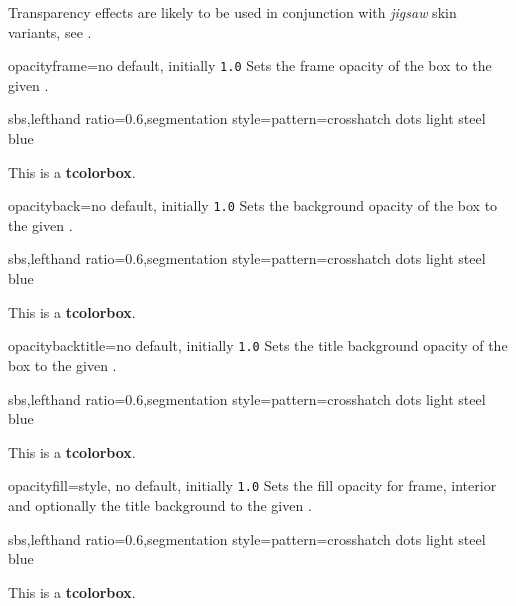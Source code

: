 \begin{marker}
Transparency effects are likely to be used in conjunction with \emph{jigsaw}
skin variants, see .
\end{marker}

\begin{docTcbKey}{opacityframe}{=}{no default, initially \texttt{1.0}}
  Sets the frame opacity of the box to the given .
\begin{dispExample*}{sbs,lefthand ratio=0.6,segmentation style={pattern=crosshatch dots light steel blue}}
\begin{tcolorbox}[opacityframe=0.25]
This is a \textbf{tcolorbox}.
\end{tcolorbox}
\end{dispExample*}
\end{docTcbKey}

\begin{docTcbKey}{opacityback}{=}{no default, initially \texttt{1.0}}
  Sets the background opacity of the box to the given .
\begin{dispExample*}{sbs,lefthand ratio=0.6,segmentation style={pattern=crosshatch dots light steel blue}}
\begin{tcolorbox}[standard jigsaw,
  opacityframe=0.5, opacityback=0.5]
This is a \textbf{tcolorbox}.
\end{tcolorbox}
\end{dispExample*}
\end{docTcbKey}


\begin{docTcbKey}{opacitybacktitle}{=}{no default, initially \texttt{1.0}}
  Sets the title background opacity of the box to the given .
\begin{dispExample*}{sbs,lefthand ratio=0.6,segmentation style={pattern=crosshatch dots light steel blue}}
\begin{tcolorbox}[standard jigsaw,
  opacityframe=0.5, opacitybacktitle=0.5,
  title filled, title=This is a title]
This is a \textbf{tcolorbox}.
\end{tcolorbox}
\end{dispExample*}
\end{docTcbKey}


\begin{docTcbKey}{opacityfill}{=}{style, no default, initially \texttt{1.0}}
  Sets the fill opacity for frame, interior and optionally the title background
  to the given .
\begin{dispExample*}{sbs,lefthand ratio=0.6,segmentation style={pattern=crosshatch dots light steel blue}}
\begin{tcolorbox}[standard jigsaw,
  opacityfill=0.7, title=This is a title]
This is a \textbf{tcolorbox}.
\end{tcolorbox}
\end{dispExample*}
\end{docTcbKey}

